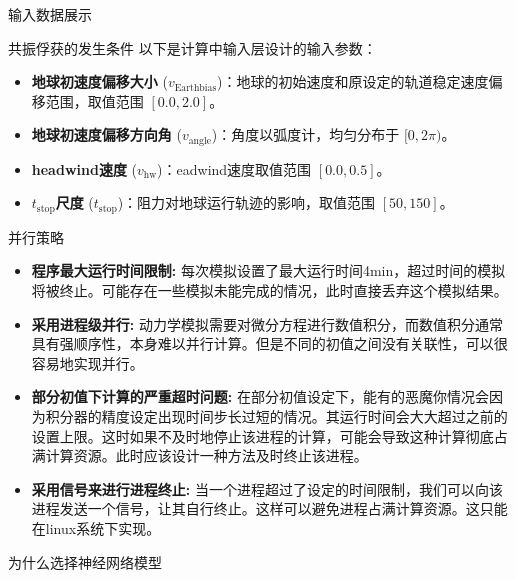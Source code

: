 \documentclass{beamer}		%
\begin{document}
\begin{frame}{输入数据展示}

\end{frame}

\begin{frame}{共振俘获的发生条件}
    以下是计算中输入层设计的输入参数：
    \begin{itemize}
        \item \textbf{地球初速度偏移大小} (\(v_{\text{Earthbias}}\))：地球的初始速度和原设定的轨道稳定速度偏移范围，取值范围 \([0.0, 2.0]\)。
        \item \textbf{地球初速度偏移方向角} (\(v_{\text{angle}}\))：角度以弧度计，均匀分布于 \([0, 2\pi)\)。
        \item \textbf{headwind速度} (\(v_{\text{hw}}\))：eadwind速度取值范围 \([0.0, 0.5]\)。
        \item \textbf{\(t_{\text{stop}}\)尺度} (\(t_{\text{stop}}\))：阻力对地球运行轨迹的影响，取值范围 \([50, 150]\)。
    \end{itemize}
\end{frame}

\begin{frame}{并行策略}
    \begin{itemize}
        \item \textbf{程序最大运行时间限制:} 每次模拟设置了最大运行时间4min，超过时间的模拟将被终止。可能存在一些模拟未能完成的情况，此时直接丢弃这个模拟结果。
        \item \textbf{采用进程级并行:} 动力学模拟需要对微分方程进行数值积分，而数值积分通常具有强顺序性，本身难以并行计算。但是不同的初值之间没有关联性，可以很容易地实现并行。
        \item \textbf{部分初值下计算的严重超时问题:} 在部分初值设定下，能有的恶魔你情况会因为积分器的精度设定出现时间步长过短的情况。其运行时间会大大超过之前的设置上限。这时如果不及时地停止该进程的计算，可能会导致这种计算彻底占满计算资源。此时应该设计一种方法及时终止该进程。
        \item \textbf{采用信号来进行进程终止:} 当一个进程超过了设定的时间限制，我们可以向该进程发送一个信号，让其自行终止。这样可以避免进程占满计算资源。这只能在linux系统下实现。
        
    \end{itemize}
\end{frame}

\begin{frame}{为什么选择神经网络模型}


\end{frame}
\end{document}
